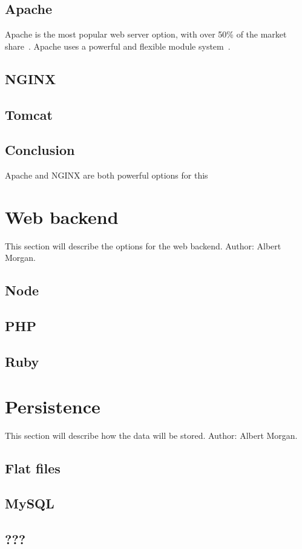 \documentclass[10pt,draftclsnofoot,onecolumn]{IEEEtran}
\newcommand*{\SignatureAndDate}[1]{
	\vspace{1in}
	\par\noindent\makebox[2.5in]{\hrulefill} \hspace{.5in} \makebox[2.0in]{\hrulefill}
	\par\noindent\makebox[2.5in][l]{#1}      \hspace{.5in} \makebox[2.0in][l]{Date}
}
\begin{document}
	\subsection{Apache}
	Apache is the most popular web server option, with over 50\% of the market share~\cite{apache-usage-statistics}.
	Apache uses a powerful and flexible module system~\cite{apache-vs-nginx-practical-considerations}.
	\subsection{NGINX}
	
	\subsection{Tomcat}
	\subsection{Conclusion}
	Apache and NGINX are both powerful options for this
	\section{Web backend}
	This section will describe the options for the web backend. Author: Albert Morgan.
	\subsection{Node}
	\subsection{PHP}
	\subsection{Ruby}
	\section{Persistence}
	This section will describe how the data will be stored. Author: Albert Morgan.
	\subsection{Flat files}
	\subsection{MySQL}
	\subsection{???}







\end{document}
